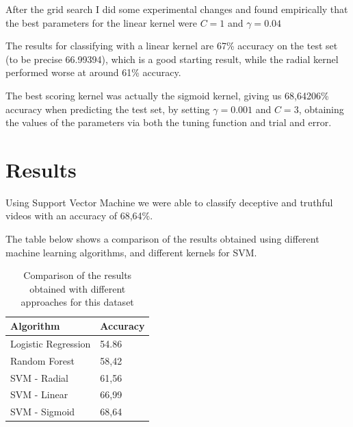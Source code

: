 After the grid search I did some experimental changes and found empirically that the best parameters for the linear kernel were $C = 1$ and $\gamma = 0.04$

The results for classifying with a linear kernel are 67\% accuracy on the test set (to be precise 66.99394), which is a good starting result, while the radial kernel performed worse at around 61\% accuracy.

The best scoring kernel was actually the sigmoid kernel, giving us 68,64206\% accuracy when predicting the test set, by setting $\gamma  = 0.001$ and $C = 3$, obtaining the values of the parameters via both the tuning function and trial and error.

\clearpage

\section{Results} \label{results}
Using Support Vector Machine we were able to classify deceptive and truthful videos with an accuracy of 68,64\%.

The table below shows a comparison of the results obtained using different machine learning algorithms, and different kernels for SVM.

\begin{table}[H]
	\centering
	\begin{tabular}{|l|l|}
		\hline
		\textbf{Algorithm}  & \textbf{Accuracy} \\ \hline
		Logistic Regression & 54.86             \\ \hline
		Random Forest       & 58,42             \\ \hline
		SVM - Radial        & 61,56             \\ \hline
		SVM - Linear        & 66,99             \\ \hline
		SVM - Sigmoid       & 68,64             \\ \hline
	\end{tabular}
	\caption{Comparison of the results obtained with different approaches for this dataset}
\end{table}
